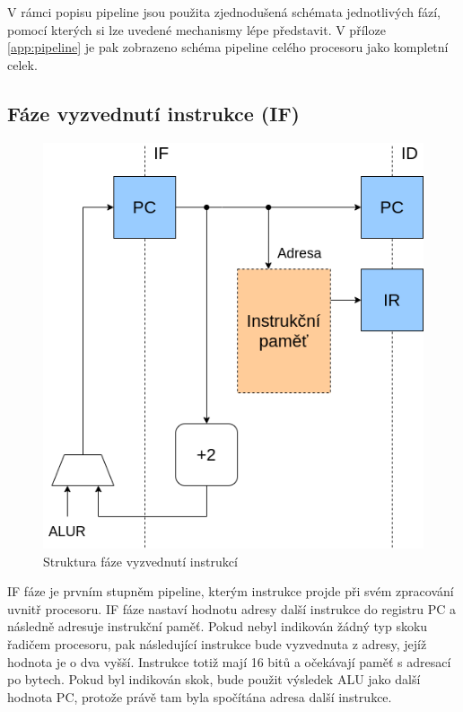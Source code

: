 \documentclass[
  digital, %
  color,   %
  table,   %
  twoside, %
  nolof,   %
  nolot,   %
]{fithesis3}
\begin{document}
V rámci popisu pipeline jsou použita zjednodušená schémata jednotlivých fází, pomocí kterých si lze uvedené mechanismy lépe představit. V příloze \ref{app:pipeline} je pak zobrazeno schéma pipeline celého procesoru jako kompletní celek. \newpage

\subsection{Fáze vyzvednutí instrukce (IF)}
\begin{figure}[H]
  \begin{center}
    \includegraphics[height=0.3\textheight]{img/risc63-if}
  \end{center}
  \caption{Struktura fáze vyzvednutí instrukcí}
  \label{fig:if}
\end{figure}

IF fáze je prvním stupněm pipeline, kterým instrukce projde při svém zpracování uvnitř procesoru. IF fáze nastaví hodnotu adresy další instrukce do registru PC a následně adresuje instrukční paměť. Pokud nebyl indikován žádný typ skoku řadičem procesoru, pak následující instrukce bude vyzvednuta z adresy, jejíž hodnota je o dva vyšší. Instrukce totiž mají 16 bitů a očekávají paměť s adresací po bytech. Pokud byl indikován skok, bude použit výsledek ALU jako další hodnota PC, protože právě tam byla spočítána adresa další instrukce.
\end{document}
